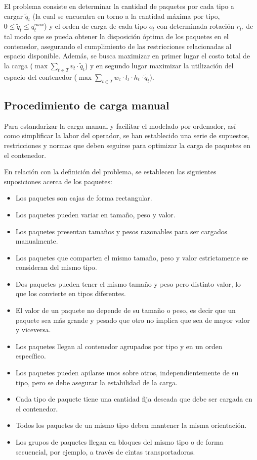 El problema consiste en determinar la cantidad de paquetes por cada tipo a cargar $\tilde{q}_t$ (la cual se encuentra en torno a la cantidad máxima por tipo, $0 \leq \tilde{q}_t \leq q^{max}_t$) y el orden de carga de cada tipo $o_t$ con determinada rotación $r_t$, de tal modo que se pueda obtener la disposición óptima de los paquetes en el contenedor, asegurando el cumplimiento de las restricciones relacionadas al espacio disponible. Además, se busca maximizar en primer lugar el costo total de la carga ($\max \sum_{t \in T} v_t \cdot \tilde{q}_t$) y en segundo lugar maximizar la utilización del espacio del contenedor ($\max \sum_{t \in T} w_t \cdot l_t \cdot h_t \cdot \tilde{q}_t$).


\subsection{Procedimiento de carga manual}

Para estandarizar la carga manual y facilitar el modelado por ordenador, así como simplificar la labor del operador, se han establecido una serie de supuestos, restricciones y normas que deben seguirse para optimizar la carga de paquetes en el contenedor.

En relación con la definición del problema, se establecen las siguientes suposiciones acerca de los paquetes:

\begin{itemize}
    \item Los paquetes son cajas de forma rectangular.
    \item Los paquetes pueden variar en tamaño, peso y valor.
    \item Los paquetes presentan tamaños y pesos razonables para ser cargados manualmente.
    \item Los paquetes que comparten el mismo tamaño, peso y valor estrictamente se consideran del mismo tipo.
    \item Dos paquetes pueden tener el mismo tamaño y peso pero distinto valor, lo que los convierte en tipos diferentes.
    \item El valor de un paquete no depende de su tamaño o peso, es decir que un paquete sea más grande y pesado que otro no implica que sea de mayor valor y viceversa.
    \item Los paquetes llegan al contenedor agrupados por tipo y en un orden específico.
    \item Los paquetes pueden apilarse unos sobre otros, independientemente de su tipo, pero se debe asegurar la estabilidad de la carga.
    \item Cada tipo de paquete tiene una cantidad fija deseada que debe ser cargada en el contenedor.
    \item Todos los paquetes de un mismo tipo deben mantener la misma orientación.
    \item Los grupos de paquetes llegan en bloques del mismo tipo o de forma secuencial, por ejemplo, a través de cintas transportadoras.
\end{itemize}

